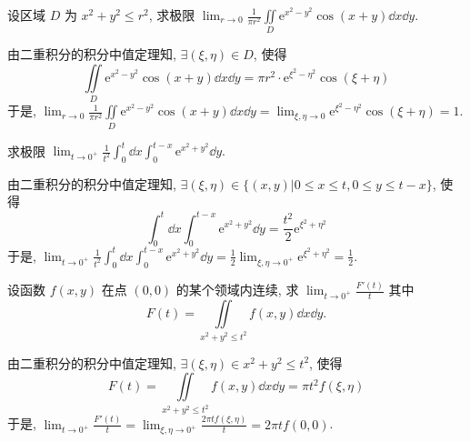\begin{example}
    设区域 $D$ 为 $x^2+y^2\leqslant r^2$, 求极限 $\displaystyle\lim_{r\to0}\frac{1}{\pi r^2}\iint\limits_D\mathrm{e}^{x^2-y^2}\cos(x+y)\dd x\dd y.$
\end{example}
\begin{solution}
    由二重积分的积分中值定理知, $\displaystyle\exists(\xi,\eta)\in D$, 使得
    $$\iint\limits_D\mathrm{e}^{x^2-y^2}\cos(x+y)\dd x\dd y=\pi r^2\cdot\mathrm{e}^{\xi^2-\eta^2}\cos(\xi+\eta)$$
    于是, $\displaystyle\lim_{r\to0}\frac{1}{\pi r^2}\iint\limits_D\mathrm{e}^{x^2-y^2}\cos(x+y)\dd x\dd y
        =\lim_{\xi,\eta\to0}\mathrm{e}^{\xi^2-\eta^2}\cos(\xi+\eta)=1$.
\end{solution}

\begin{example}[2009 南京工业大学]
    求极限 $\displaystyle\lim_{t\to0^+}\frac{1}{t^2}\int_0^t\dd x\int_0^{t-x}\mathrm{e}^{x^2+y^2}\dd y.$
\end{example}
\begin{solution}
    由二重积分的积分中值定理知, $\displaystyle\exists(\xi,\eta)\in \{(x,y)|0\leqslant x\leqslant t,0\leqslant y\leqslant t-x\}$, 使得
    $$\int_0^t\dd x\int_0^{t-x}\mathrm{e}^{x^2+y^2}\dd y=\frac{t^2}{2}\mathrm{e}^{\xi^2+\eta^2}$$
    于是, $\displaystyle\lim_{t\to0^+}\frac{1}{t^2}\int_0^t\dd x\int_0^{t-x}\mathrm{e}^{x^2+y^2}\dd y
        =\frac{1}{2}\lim_{\xi,\eta\to0^+}\mathrm{e}^{\xi^2+\eta^2}=\frac{1}{2}$.
\end{solution}
\begin{example}[2016 年天津市 (理工)]
    设函数 $f(x,y)$ 在点 $(0,0)$ 的某个领域内连续, 求 $\displaystyle\lim_{t\to0^+}\frac{F'(t)}{t}$
    其中 $$F(t)=\iint\limits_{x^2+y^2\leqslant t^2}f(x,y)\dd x\dd y.$$
\end{example}
\begin{solution}
    由二重积分的积分中值定理知, $\exists(\xi,\eta)\in x^2+y^2\leqslant t^2$, 使得
    $$F(t)=\iint\limits_{x^2+y^2\leqslant t^2}f(x,y)\dd x\dd y=\pi t^2 f(\xi,\eta)$$
    于是, $\displaystyle\lim_{t\to0^+}\frac{F'(t)}{t}=\lim_{\xi,\eta\to0^+}\frac{2\pi tf(\xi,\eta)}{t}
        =2\pi tf(0,0)$.
\end{solution}

